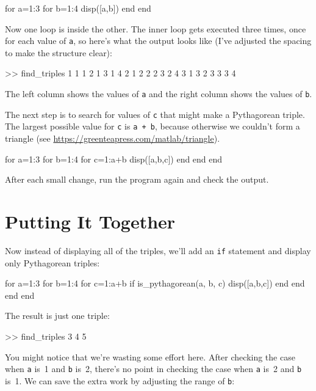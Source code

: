 \begin{code}
for a=1:3
    for b=1:4
        disp([a,b])
    end
end
\end{code}

Now one loop is inside the other.  The inner loop gets executed three times, once for each value of \lstinline{a}, so here's what the output looks like (I've adjusted the spacing to make the structure clear):

\begin{code}
>> find_triples
     1     1
     1     2
     1     3
     1     4
     2     1
     2     2
     2     3
     2     4
     3     1
     3     2
     3     3
     3     4
\end{code}

The left column shows the values of \lstinline{a} and the right column shows the values of \lstinline{b}.

The next step is to search for values of \lstinline{c} that might make a Pythagorean triple.  The largest possible value for \lstinline{c} is \lstinline{a + b}, because otherwise we couldn't form a triangle
(see \url{https://greenteapress.com/matlab/triangle}).

\begin{code}
for a=1:3
    for b=1:4
        for c=1:a+b
            disp([a,b,c])
        end
    end
end
\end{code}

After each small change, run the program again and check the output.

\section{Putting It Together}

Now instead of displaying all of the triples, we'll add an \lstinline{if} statement and display only Pythagorean triples:

\begin{code}
for a=1:3
    for b=1:4
        for c=1:a+b
            if is_pythagorean(a, b, c)
                disp([a,b,c])
            end
        end
    end
end
\end{code}

The result is just one triple:

\begin{code}
>> find_triples
     3     4     5
\end{code}

You might notice that we're wasting some effort here.
After checking the case when \lstinline{a} is~1 and \lstinline{b} is~2, there's no point in checking
the case when \lstinline{a} is~2 and \lstinline{b} is~1.  We can save the extra work by adjusting the
range of \lstinline{b}:

